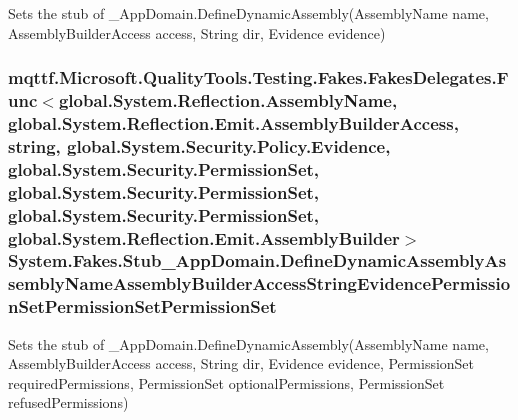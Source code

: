 Sets the stub of \-\_\-\-App\-Domain.\-Define\-Dynamic\-Assembly(\-Assembly\-Name name, Assembly\-Builder\-Access access, String dir, Evidence evidence)

\hypertarget{class_system_1_1_fakes_1_1_stub___app_domain_a97b51300c8e6d34c623de11d99c62404}{
\subsubsection[{Define\-Dynamic\-Assembly\-Assembly\-Name\-Assembly\-Builder\-Access\-String\-Evidence\-Permission\-Set\-Permission\-Set\-Permission\-Set}]{\setlength{\rightskip}{0pt plus 5cm}mqttf.\-Microsoft.\-Quality\-Tools.\-Testing.\-Fakes.\-Fakes\-Delegates.\-Func$<$global.\-System.\-Reflection.\-Assembly\-Name, global.\-System.\-Reflection.\-Emit.\-Assembly\-Builder\-Access, string, global.\-System.\-Security.\-Policy.\-Evidence, global.\-System.\-Security.\-Permission\-Set, global.\-System.\-Security.\-Permission\-Set, global.\-System.\-Security.\-Permission\-Set, global.\-System.\-Reflection.\-Emit.\-Assembly\-Builder$>$ System.\-Fakes.\-Stub\-\_\-\-App\-Domain.\-Define\-Dynamic\-Assembly\-Assembly\-Name\-Assembly\-Builder\-Access\-String\-Evidence\-Permission\-Set\-Permission\-Set\-Permission\-Set}}\label{class_system_1_1_fakes_1_1_stub___app_domain_a97b51300c8e6d34c623de11d99c62404}


Sets the stub of \-\_\-\-App\-Domain.\-Define\-Dynamic\-Assembly(\-Assembly\-Name name, Assembly\-Builder\-Access access, String dir, Evidence evidence, Permission\-Set required\-Permissions, Permission\-Set optional\-Permissions, Permission\-Set refused\-Permissions)

